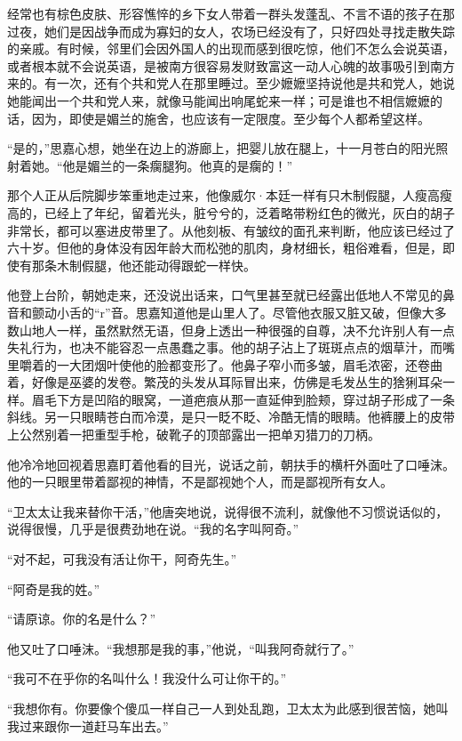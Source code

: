 \par 经常也有棕色皮肤、形容憔悴的乡下女人带着一群头发蓬乱、不言不语的孩子在那过夜，她们是因战争而成为寡妇的女人，农场已经没有了，只好四处寻找走散失踪的亲戚。有时候，邻里们会因外国人的出现而感到很吃惊，他们不怎么会说英语，或者根本就不会说英语，是被南方很容易发财致富这一动人心魄的故事吸引到南方来的。有一次，还有个共和党人在那里睡过。至少嬷嬷坚持说他是共和党人，她说她能闻出一个共和党人来，就像马能闻出响尾蛇来一样；可是谁也不相信嬷嬷的话，因为，即使是媚兰的施舍，也应该有一定限度。至少每个人都希望这样。
\par “是的，”思嘉心想，她坐在边上的游廊上，把婴儿放在腿上，十一月苍白的阳光照射着她。“他是媚兰的一条瘸腿狗。他真的是瘸的！”
\par 那个人正从后院脚步笨重地走过来，他像威尔·本廷一样有只木制假腿，人瘦高瘦高的，已经上了年纪，留着光头，脏兮兮的，泛着略带粉红色的微光，灰白的胡子非常长，都可以塞进皮带里了。从他刻板、有皱纹的面孔来判断，他应该已经过了六十岁。但他的身体没有因年龄大而松弛的肌肉，身材细长，粗俗难看，但是，即使有那条木制假腿，他还能动得跟蛇一样快。
\par 他登上台阶，朝她走来，还没说出话来，口气里甚至就已经露出低地人不常见的鼻音和颤动小舌的“r”音。思嘉知道他是山里人了。尽管他衣服又脏又破，但像大多数山地人一样，虽然默然无语，但身上透出一种很强的自尊，决不允许别人有一点失礼行为，也决不能容忍一点愚蠢之事。他的胡子沾上了斑斑点点的烟草汁，而嘴里嚼着的一大团烟叶使他的脸都变形了。他鼻子窄小而多皱，眉毛浓密，还卷曲着，好像是巫婆的发卷。繁茂的头发从耳际冒出来，仿佛是毛发丛生的猞猁耳朵一样。眉毛下方是凹陷的眼窝，一道疤痕从那一直延伸到脸颊，穿过胡子形成了一条斜线。另一只眼睛苍白而冷漠，是只一眨不眨、冷酷无情的眼睛。他裤腰上的皮带上公然别着一把重型手枪，破靴子的顶部露出一把单刃猎刀的刀柄。
\par 他冷冷地回视着思嘉盯着他看的目光，说话之前，朝扶手的横杆外面吐了口唾沫。他的一只眼里带着鄙视的神情，不是鄙视她个人，而是鄙视所有女人。
\par “卫太太让我来替你干活，”他唐突地说，说得很不流利，就像他不习惯说话似的，说得很慢，几乎是很费劲地在说。“我的名字叫阿奇。”
\par “对不起，可我没有活让你干，阿奇先生。”
\par “阿奇是我的姓。”
\par “请原谅。你的名是什么？”
\par 他又吐了口唾沫。“我想那是我的事，”他说，“叫我阿奇就行了。”
\par “我可不在乎你的名叫什么！我没什么可让你干的。”
\par “我想你有。你要像个傻瓜一样自己一人到处乱跑，卫太太为此感到很苦恼，她叫我过来跟你一道赶马车出去。”

